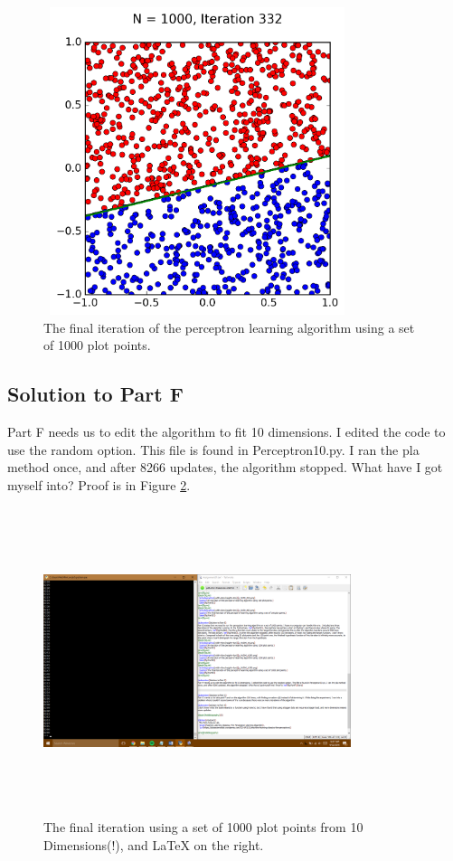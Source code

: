 \documentclass[a4paper]{article}
\begin{document}
\begin{figure}
  \includegraphics[width=9cm,height=9cm]{p_N1000_it332.png}
  \caption{The final iteration of the perceptron learning algorithm using a set of 1000 plot points.}
  \label{fig:PartE3}
\end{figure}

\subsection{Solution to Part F}
Part F needs us to edit the algorithm to fit 10 dimensions. I edited the code to use the random option. This file is found in Perceptron10.py. I ran the pla method once, and after 8266 updates, the algorithm stopped. What have I got myself into? Proof is in Figure \ref{fig:PartF}.

\begin{figure}
  \includegraphics[width=9cm,height=9cm]{10DimensionConvergence.png}
  \caption{The final iteration using a set of 1000 plot points from 10 Dimensions(!), and LaTeX on the right.}
  \label{fig:PartF}
\end{figure}
\end{document}

